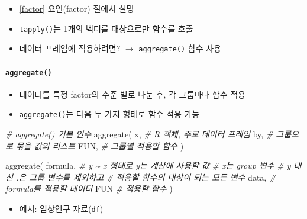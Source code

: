 \documentclass[
  11pt,
]{krantz}
\newenvironment{Shaded}{\begin{snugshade}}{\end{snugshade}}
\newcommand{\CommentTok}[1]{\textcolor[rgb]{0.37,0.37,0.37}{\textit{#1}}}
\newcommand{\FunctionTok}[1]{\textcolor[rgb]{0,0,0}{#1}}
\newcommand{\NormalTok}[1]{#1}
\providecommand{\tightlist}{%
  \setlength{\itemsep}{0pt}\setlength{\parskip}{0pt}}
\begin{document}
\begin{itemize}
\tightlist
\item
  \ref{factor} 요인(factor) 절에서 설명
\item
  \texttt{tapply()}는 1개의 벡터를 대상으로만 함수를 호출
\item
  데이터 프레임에 적용하려면? \(\rightarrow\) \texttt{aggregate()} 함수 사용
\end{itemize}

\hypertarget{aggregate}{%
\paragraph*{\texorpdfstring{\texttt{aggregate()}}{aggregate()}}\label{aggregate}}

\begin{itemize}
\tightlist
\item
  데이터를 특정 factor의 수준 별로 나눈 후, 각 그룹마다 함수 적용
\item
  \texttt{aggregate()}는 다음 두 가지 형태로 함수 적용 가능
\end{itemize}

\footnotesize

\begin{Shaded}
\begin{Highlighting}[]
\CommentTok{\# aggregate() 기본 인수}
\FunctionTok{aggregate}\NormalTok{(}
\NormalTok{  x, }\CommentTok{\# R 객체, 주로 데이터 프레임}
\NormalTok{  by, }\CommentTok{\# 그룹으로 묶을 값의 리스트}
\NormalTok{  FUN, }\CommentTok{\# 그룹별 적용할 함수}
\NormalTok{)}

\FunctionTok{aggregate}\NormalTok{(}
\NormalTok{  formula, }\CommentTok{\# y \textasciitilde{} x 형태로 y는 계산에 사용할 값}
           \CommentTok{\# x는 group 변수}
           \CommentTok{\# y 대신 .은 그룹 변수를 제외하고 }
           \CommentTok{\# 적용할 함수의 대상이 되는 모든 변수}
\NormalTok{  data, }\CommentTok{\# formula를 적용할 데이터}
\NormalTok{  FUN }\CommentTok{\# 적용할 함수}
\NormalTok{)}
\end{Highlighting}
\end{Shaded}

\normalsize

\begin{itemize}
\tightlist
\item
  예시: 임상연구 자료(\texttt{df})
\end{itemize}

\footnotesize
\end{document}
